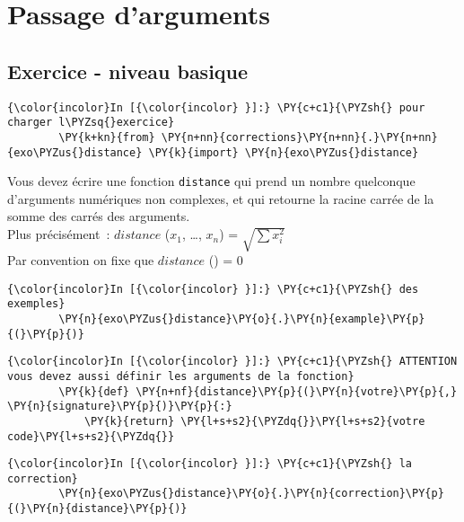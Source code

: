     \hypertarget{passage-darguments}{%
\section{Passage d'arguments}\label{passage-darguments}}

    \hypertarget{exercice---niveau-basique}{%
\subsection{Exercice - niveau basique}\label{exercice---niveau-basique}}

    \begin{Verbatim}[commandchars=\\\{\}]
{\color{incolor}In [{\color{incolor} }]:} \PY{c+c1}{\PYZsh{} pour charger l\PYZsq{}exercice}
        \PY{k+kn}{from} \PY{n+nn}{corrections}\PY{n+nn}{.}\PY{n+nn}{exo\PYZus{}distance} \PY{k}{import} \PY{n}{exo\PYZus{}distance}
\end{Verbatim}


    Vous devez écrire une fonction \texttt{distance} qui prend un nombre
quelconque d'arguments numériques non complexes, et qui retourne la
racine carrée de la somme des carrés des arguments.\\

Plus précisément~: \(distance\) (\(x_1\), \ldots{}, \(x_n\)) =
\(\sqrt{\sum x_i^2}\)\\

Par convention on fixe que \(distance\) () = 0

    \begin{Verbatim}[commandchars=\\\{\}]
{\color{incolor}In [{\color{incolor} }]:} \PY{c+c1}{\PYZsh{} des exemples}
        \PY{n}{exo\PYZus{}distance}\PY{o}{.}\PY{n}{example}\PY{p}{(}\PY{p}{)}
\end{Verbatim}


    \begin{Verbatim}[commandchars=\\\{\}]
{\color{incolor}In [{\color{incolor} }]:} \PY{c+c1}{\PYZsh{} ATTENTION vous devez aussi définir les arguments de la fonction}
        \PY{k}{def} \PY{n+nf}{distance}\PY{p}{(}\PY{n}{votre}\PY{p}{,} \PY{n}{signature}\PY{p}{)}\PY{p}{:}
            \PY{k}{return} \PY{l+s+s2}{\PYZdq{}}\PY{l+s+s2}{votre code}\PY{l+s+s2}{\PYZdq{}}
\end{Verbatim}


    \begin{Verbatim}[commandchars=\\\{\}]
{\color{incolor}In [{\color{incolor} }]:} \PY{c+c1}{\PYZsh{} la correction}
        \PY{n}{exo\PYZus{}distance}\PY{o}{.}\PY{n}{correction}\PY{p}{(}\PY{n}{distance}\PY{p}{)}
\end{Verbatim}


